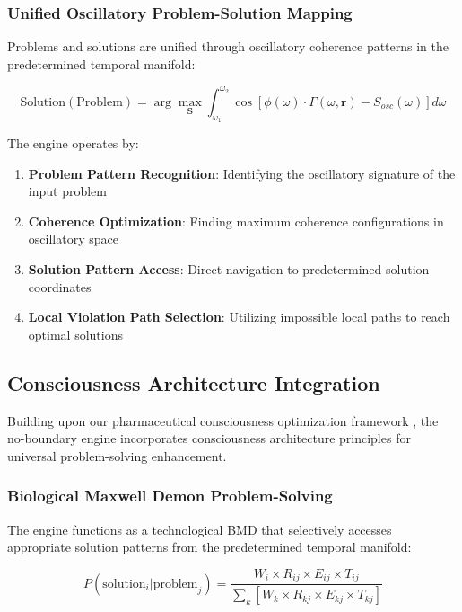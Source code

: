 \documentclass[11pt,a4paper]{article}
\theoremstyle{remark}
\begin{document}
\subsubsection{Unified Oscillatory Problem-Solution Mapping}

Problems and solutions are unified through oscillatory coherence patterns in the predetermined temporal manifold:

\begin{equation}
\text{Solution}(\text{Problem}) = \arg\max_{\mathbf{S}} \int_{\omega_1}^{\omega_2} \cos[\phi(\omega) \cdot \Gamma(\omega, \mathbf{r}) - S_{osc}(\omega)] d\omega
\end{equation}

The engine operates by:\begin{enumerate}
\item \textbf{Problem Pattern Recognition}: Identifying the oscillatory signature of the input problem
\item \textbf{Coherence Optimization}: Finding maximum coherence configurations in oscillatory space
\item \textbf{Solution Pattern Access}: Direct navigation to predetermined solution coordinates
\item \textbf{Local Violation Path Selection}: Utilizing impossible local paths to reach optimal solutions
\end{enumerate}


\subsection{Consciousness Architecture Integration}

Building upon our pharmaceutical consciousness optimization framework \cite{sachikonye2024pharma}, the no-boundary engine incorporates consciousness architecture principles for universal problem-solving enhancement.

\subsubsection{Biological Maxwell Demon Problem-Solving}

The engine functions as a technological BMD that selectively accesses appropriate solution patterns from the predetermined temporal manifold:

\begin{equation}
P(\text{solution}_i | \text{problem}_j) = \frac{W_i \times R_{ij} \times E_{ij} \times T_{ij}}{\sum_k[W_k \times R_{kj} \times E_{kj} \times T_{kj}]}
\end{equation}
\end{document}
